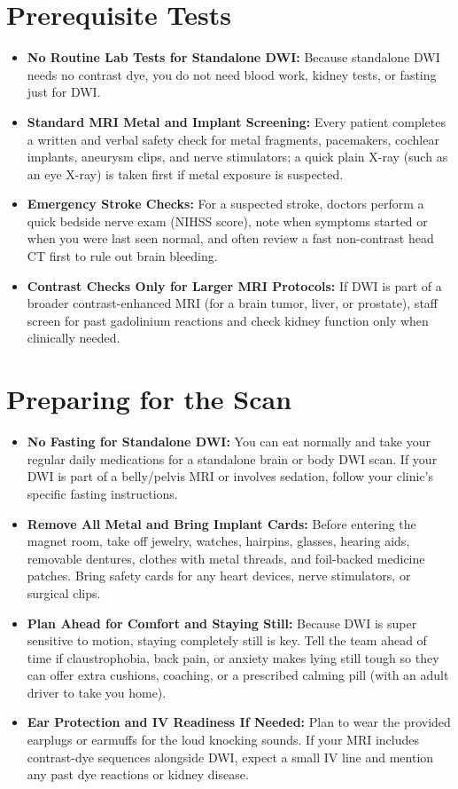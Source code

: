 \section{Prerequisite Tests}
\begin{itemize}
\item \textbf{No Routine Lab Tests for Standalone DWI:} Because standalone DWI needs no contrast dye, you do not need blood work, kidney tests, or fasting just for DWI.
\item \textbf{Standard MRI Metal and Implant Screening:} Every patient completes a written and verbal safety check for metal fragments, pacemakers, cochlear implants, aneurysm clips, and nerve stimulators; a quick plain X-ray (such as an eye X-ray) is taken first if metal exposure is suspected.
\item \textbf{Emergency Stroke Checks:} For a suspected stroke, doctors perform a quick bedside nerve exam (NIHSS score), note when symptoms started or when you were last seen normal, and often review a fast non-contrast head CT first to rule out brain bleeding.
\item \textbf{Contrast Checks Only for Larger MRI Protocols:} If DWI is part of a broader contrast-enhanced MRI (for a brain tumor, liver, or prostate), staff screen for past gadolinium reactions and check kidney function only when clinically needed.
\end{itemize}

\section{Preparing for the Scan}
\begin{itemize}
\item \textbf{No Fasting for Standalone DWI:} You can eat normally and take your regular daily medications for a standalone brain or body DWI scan. If your DWI is part of a belly/pelvis MRI or involves sedation, follow your clinic's specific fasting instructions.
\item \textbf{Remove All Metal and Bring Implant Cards:} Before entering the magnet room, take off jewelry, watches, hairpins, glasses, hearing aids, removable dentures, clothes with metal threads, and foil-backed medicine patches. Bring safety cards for any heart devices, nerve stimulators, or surgical clips.
\item \textbf{Plan Ahead for Comfort and Staying Still:} Because DWI is super sensitive to motion, staying completely still is key. Tell the team ahead of time if claustrophobia, back pain, or anxiety makes lying still tough so they can offer extra cushions, coaching, or a prescribed calming pill (with an adult driver to take you home).
\item \textbf{Ear Protection and IV Readiness If Needed:} Plan to wear the provided earplugs or earmuffs for the loud knocking sounds. If your MRI includes contrast-dye sequences alongside DWI, expect a small IV line and mention any past dye reactions or kidney disease.
\end{itemize}

